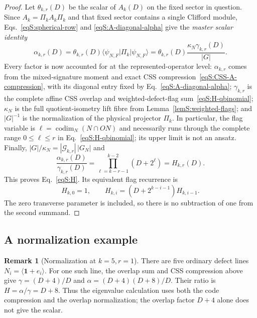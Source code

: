 \documentclass[journal,twocolumn]{IEEEtran}
\theoremstyle{definition}
\newtheorem{remark}[theorem]{Remark}
\theoremstyle{plain}
\newcommand{\one}{\bm 1}
\newcommand{\cG}{\mathcal G}
\begin{document}
\begin{proof}
Let $\theta_{k,r}(D)$ be the scalar of $A_k(D)$ on the fixed sector in
question.  Since $A_k=\Pi_kA_k\Pi_k$ and that fixed sector contains a single
Clifford module, Eqs.~\eqref{eqS:spherical-row} and
\eqref{eqS:A-diagonal-alpha} give the \emph{master scalar identity}
\begin{equation}
 \alpha_{k,r}(D)
 =\theta_{k,r}(D)
   \langle\psi_{N,F}|\Pi_k|\psi_{N,F}\rangle
 =\theta_{k,r}(D)\frac{\kappa_N\gamma_{k,r}(D)}{|G|}.
 \label{eqS:spherical-ratio}
\end{equation}
Every factor is now accounted for at the represented-operator level:
$\alpha_{k,r}$ comes from the mixed-signature moment and exact CSS
compression~\eqref{eqS:CSS-A-compression}, with its diagonal entry fixed by
Eq.~\eqref{eqS:A-diagonal-alpha}; $\gamma_{k,r}$ is the complete affine CSS
overlap and weighted-defect-flag sum~\eqref{eqS:H-qbinomial}; $\kappa_N$ is
the full quotient-isometry lift fibre from
Lemma~\ref{lemS:weighted-flags}; and $|G|^{-1}$ is the normalization of the
physical projector $\Pi_k$.  In particular, the flag variable is
$\ell=\operatorname{codim}_N(N\cap ON)$ and necessarily runs through the
complete range $0\leq\ell\leq r$ in Eq.~\eqref{eqS:H-qbinomial}; its upper
limit is not an ansatz.
Finally,
$|G|/\kappa_N=|\cG_{k,r}|\,|G_N|$ and
\begin{equation}
 \frac{\alpha_{k,r}(D)}{\gamma_{k,r}(D)}
 =\prod_{\ell=k-r-1}^{k-2}(D+2^\ell)=H_{k,r}(D).
 \label{eqS:H-ratio}
\end{equation}
This proves Eq.~\eqref{eqS:H}.  Its equivalent flag recurrence is
\begin{equation}
 H_{k,0}=1,\qquad
 H_{k,i}=(D+2^{k-i-1})H_{k,i-1}.
 \label{eqS:H-recurrence}
\end{equation}
The zero transverse parameter is included, so there is no subtraction of
one from the second summand.
\end{proof}

\subsection{A normalization example}
\label{app:normalization-example}

\begin{remark}[Normalization at $k=5,r=1$]
There are five ordinary defect lines
$N_i=\langle\one+e_i\rangle$.  For one such line, the overlap sum and CSS
compression above give
$\gamma=(D+4)/D$ and $\alpha=(D+4)(D+8)/D$.
Their ratio is $H=\alpha/\gamma=D+8$.  Thus the eigenvalue calculation
uses both the code compression and the overlap normalization; the overlap
factor $D+4$ alone does not give the scalar.
\end{remark}
\end{document}
